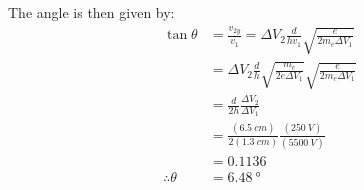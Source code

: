 \begin{solution}
The angle is then given by:
\begin{align*}
\tan\theta&=\frac{v_{2y}}{v_1}=\Delta V_2\frac{d}{hv_1}\sqrt{\frac{e}{2m_e\Delta V_1}}\\
&=\Delta V_2\frac{d}{h}\sqrt{\frac{m_e}{2e\Delta V_1}}\sqrt{\frac{e}{2m_e\Delta V_1}}\\
&=\frac{d}{2h}\frac{\Delta V_2}{\Delta V_1}\\
&=\frac{(\SI{6.5}{cm})}{2(\SI{1.3}{cm})}\frac{(\SI{250}{V})}{(\SI{5500}{V})}\\
&=0.1136\\
\therefore \theta &= \SI{6.48}{\degree}
\end{align*}
\end{solution}








